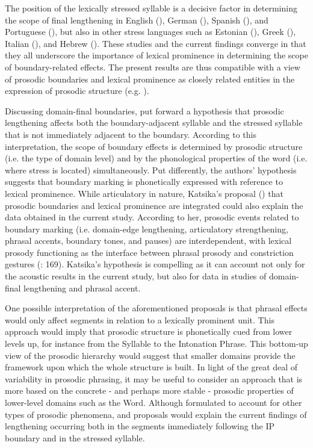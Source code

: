 \documentclass[output=paper]{langscibook}
\begin{document}
The position of the lexically stressed syllable is a decisive factor in determining the scope of final lengthening in English (\citealt{kkc18, ckk17, br08, ts07, w02, o73}), German (), Spanish (\citealt{r10}), and Portuguese (\citealt{f00}), but also in other stress languages such as Estonian (\citealt{k97}), Greek (\citealt{k16}), Italian (\citealt{pdlf14}), and Hebrew (\citealt{b94}). These studies and the current findings converge in that they all underscore the importance of lexical prominence in determining the scope of boundary-related effects. The present results are thus compatible with a view of prosodic boundaries and lexical prominence as closely related entities in the expression of prosodic structure (e.g. \citealt{ts07, k16}). 

Discussing domain-final boundaries, \citet{ts07} put forward a hypothesis that prosodic lengthening affects both the boundary-adjacent syllable and the stressed syllable that is not immediately adjacent to the boundary. According to this interpretation, the scope of boundary effects is determined by prosodic structure (i.e. the type of domain level) and by the phonological properties of the word (i.e. where stress is located) simultaneously. Put differently, the authors’ hypothesis suggests that boundary marking is phonetically expressed with reference to lexical prominence. While articulatory in nature, Katsika's proposal (\citealt{k16}) that prosodic boundaries and lexical prominence are integrated could also explain the data obtained in the current study. According to her, prosodic events related to boundary marking (i.e. domain-edge lengthening, articulatory strengthening, phrasal accents, boundary tones, and pauses) are interdependent, with lexical prosody functioning as the interface between phrasal prosody and constriction gestures (\citealt{k16}: 169). Katsika’s hypothesis is compelling as it can account not only for the acoustic results in the current study, but also for data in studies of domain-final lengthening and phrasal accent.

One possible interpretation of the aforementioned proposals is that phrasal effects would only affect segments in relation to a lexically prominent unit. This approach would imply that prosodic structure is phonetically cued from lower levels up, for instance from the Syllable to the Intonation Phrase. This bottom-up view of the prosodic hierarchy would suggest that smaller domains provide the framework upon which the whole structure is built. In light of the great deal of variability in prosodic phrasing, it may be useful to consider an approach that is more based on the concrete - and perhaps more stable - prosodic properties of lower-level domains such as the Word. Although formulated to account for other types of prosodic phenomena, \citet{ts07} and \citet{k16} proposals would explain the current findings of lengthening occurring both in the segments immediately following the IP boundary and in the stressed syllable. 
\end{document}
